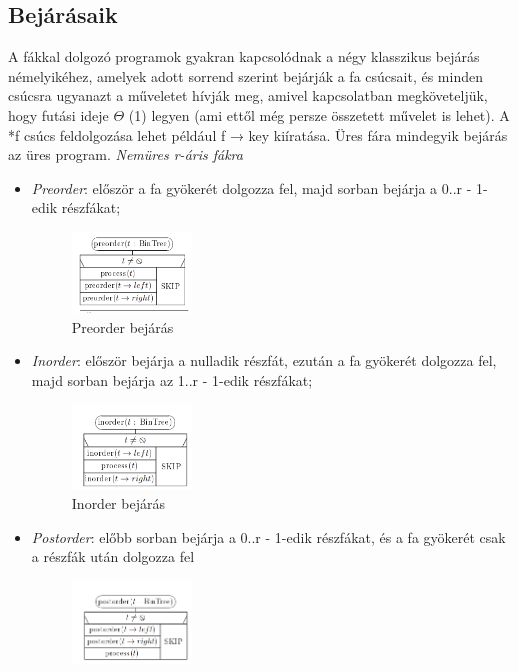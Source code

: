 \documentclass[margin=0px]{article}
\begin{document}
\subsection{Bejárásaik}
A fákkal dolgozó programok gyakran kapcsolódnak a négy klasszikus
bejárás némelyikéhez, amelyek adott sorrend szerint bejárják a fa csúcsait,
és minden csúcsra ugyanazt a műveletet hívják meg, amivel kapcsolatban
megköveteljük, hogy futási ideje $\Theta$  (1) legyen (ami ettől még persze összetett
művelet is lehet). A *f csúcs feldolgozása lehet például f → key kiíratása.
Üres fára mindegyik bejárás az üres program. 
\textit{Nemüres r-áris fákra}
\begin{itemize}
    \item \textit{Preorder}: először a fa gyökerét dolgozza fel, majd sorban bejárja a 0..r - 1-edik részfákat;
        \begin{figure}[H]
            \centering
            \includegraphics[width=0.3\textwidth]{img/preorder.png}
            \caption{Preorder bejárás}
        \end{figure}
    \item \textit{Inorder}: először bejárja a nulladik részfát, ezután a fa gyökerét dolgozza fel, majd sorban bejárja az 1..r - 1-edik részfákat;
        \begin{figure}[H]
            \centering
            \includegraphics[width=0.3\textwidth]{img/inorder.png}
            \caption{Inorder bejárás}
        \end{figure}
    \item \textit{Postorder}: előbb sorban bejárja a 0..r - 1-edik részfákat, és a fa gyökerét csak a részfák után dolgozza fel
        \begin{figure}[H]
            \centering
            \includegraphics[width=0.3\textwidth]{img/postorder.png}

\end{figure}
\end{itemize}
\end{document}
